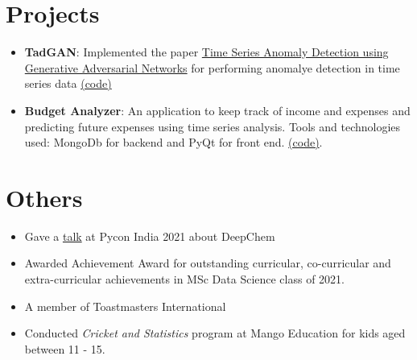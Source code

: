 \documentclass[letterpaper,11pt]{article}
\newcommand{\resumeItem}[2]{
  \item\small{
    \textbf{#1}{: #2 \vspace{-2pt}}
  }
}
\newcommand{\resumeItemSimple}[1]{
  \item\small{
    {#1 \vspace{-2pt}}
  }
}
\newcommand{\resumeSubItem}[2]{\resumeItem{#1}{#2}\vspace{-4pt}}
\newcommand{\resumeSubItemSimple}[1]{\resumeItemSimple{#1}\vspace{-4pt}}
\newcommand{\resumeSubHeadingListStart}{\begin{itemize}[leftmargin=*]}
\newcommand{\resumeSubHeadingListEnd}{\end{itemize}}
\begin{document}
\section{Projects}
  \resumeSubHeadingListStart
    \resumeSubItem{TadGAN}
      {Implemented the paper \href{https://arxiv.org/abs/2009.07769}{Time Series Anomaly Detection using Generative Adversarial Networks} for performing anomalye detection in time series data \href{https://github.com/arunppsg/tadGAN}{(code)}}
    \resumeSubItem{Budget Analyzer}
      {An application to keep track of income and expenses and predicting future expenses using time series analysis. Tools and technologies used: MongoDb for backend and PyQt for front end. \href{https://github.com/arunppsg/budget-analyzer}{(code)}.}
  \resumeSubHeadingListEnd

\section{Others}
  \resumeSubHeadingListStart
    \resumeSubItemSimple {Gave a \href{https://www.youtube.com/watch?v=JEFrzjpf6d0}{talk} at Pycon India 2021 about DeepChem}
    \resumeSubItemSimple {Awarded Achievement Award for outstanding curricular, co-curricular and extra-curricular achievements in MSc Data Science class of 2021.}
    \resumeSubItemSimple {A member of Toastmasters International}
    \resumeSubItemSimple {Conducted \textit{Cricket and Statistics} program at Mango Education for kids aged between 11 - 15.}
  \resumeSubHeadingListEnd
%
%
\end{document}
